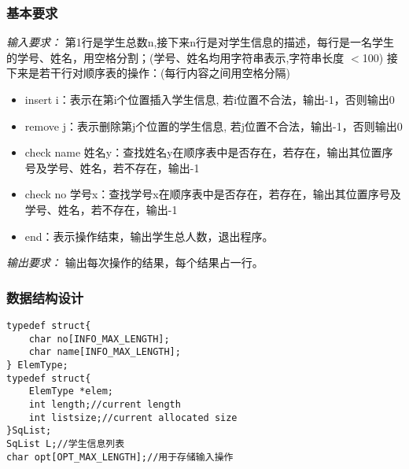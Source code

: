\documentclass[a4paper,11pt]{article}%
\newenvironment{shadedquotation}
 {\begin{shaded*}
  \quoting[leftmargin=0pt, vskip=0pt]
 }
 {\endquoting
 \end{shaded*}
}
\begin{document}
\subsubsection{基本要求}
\begin{shadedquotation}
    \emph{输入要求：}
    第1行是学生总数n,接下来n行是对学生信息的描述，每行是一名学生的学号、姓名，用空格分割；(学号、姓名均用字符串表示,字符串长度 $<$100)
接下来是若干行对顺序表的操作：(每行内容之间用空格分隔)
\begin{itemize}
    \item insert i：表示在第i个位置插入学生信息, 若i位置不合法，输出-1，否则输出0
    \item remove j：表示删除第j个位置的学生信息, 若j位置不合法，输出-1，否则输出0
    \item check name 姓名y：查找姓名y在顺序表中是否存在，若存在，输出其位置序号及学号、姓名，若不存在，输出-1
    \item check no 学号x：查找学号x在顺序表中是否存在，若存在，输出其位置序号及学号、姓名，若不存在，输出-1
    \item end：表示操作结束，输出学生总人数，退出程序。
\end{itemize}
\end{shadedquotation}
\begin{shadedquotation}
    \emph{输出要求：}
    输出每次操作的结果，每个结果占一行。
\end{shadedquotation}
\subsubsection{数据结构设计}
\begin{lstlisting}[language={[ANSI]C},keywordstyle=\color{blue!70},commentstyle=\color{red!50!green!50!blue!50},frame=shadowbox,
    rulesepcolor=\color{red!20!green!20!blue!20}]
typedef struct{
	char no[INFO_MAX_LENGTH];
	char name[INFO_MAX_LENGTH];
} ElemType;
typedef struct{
	ElemType *elem;
	int length;//current length
	int listsize;//current allocated size
}SqList;
SqList L;//学生信息列表
char opt[OPT_MAX_LENGTH];//用于存储输入操作
\end{lstlisting}
\end{document}
